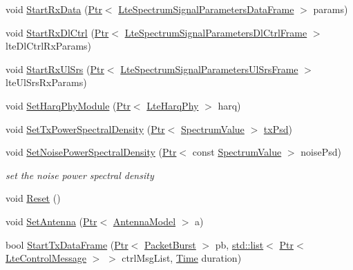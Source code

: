 \begin{DoxyCompactItemize}
\item 
void \hyperlink{classns3_1_1LteSpectrumPhy_a496c5216723459c21c02576f8a5056af}{Start\+Rx\+Data} (\hyperlink{classns3_1_1Ptr}{Ptr}$<$ \hyperlink{structns3_1_1LteSpectrumSignalParametersDataFrame}{Lte\+Spectrum\+Signal\+Parameters\+Data\+Frame} $>$ params)
\item 
void \hyperlink{classns3_1_1LteSpectrumPhy_a2ea6de28b21dcae1c26d42aecac47341}{Start\+Rx\+Dl\+Ctrl} (\hyperlink{classns3_1_1Ptr}{Ptr}$<$ \hyperlink{structns3_1_1LteSpectrumSignalParametersDlCtrlFrame}{Lte\+Spectrum\+Signal\+Parameters\+Dl\+Ctrl\+Frame} $>$ lte\+Dl\+Ctrl\+Rx\+Params)
\item 
void \hyperlink{classns3_1_1LteSpectrumPhy_a3023664623c55b331bee210d6b3cc5a5}{Start\+Rx\+Ul\+Srs} (\hyperlink{classns3_1_1Ptr}{Ptr}$<$ \hyperlink{structns3_1_1LteSpectrumSignalParametersUlSrsFrame}{Lte\+Spectrum\+Signal\+Parameters\+Ul\+Srs\+Frame} $>$ lte\+Ul\+Srs\+Rx\+Params)
\item 
void \hyperlink{classns3_1_1LteSpectrumPhy_a2d7460008f3cf83f49e1d47d4b4b4747}{Set\+Harq\+Phy\+Module} (\hyperlink{classns3_1_1Ptr}{Ptr}$<$ \hyperlink{classns3_1_1LteHarqPhy}{Lte\+Harq\+Phy} $>$ harq)
\item 
void \hyperlink{classns3_1_1LteSpectrumPhy_a8c92f3b90b60b6b726bbb9b224eb4db7}{Set\+Tx\+Power\+Spectral\+Density} (\hyperlink{classns3_1_1Ptr}{Ptr}$<$ \hyperlink{classns3_1_1SpectrumValue}{Spectrum\+Value} $>$ \hyperlink{lte__link__budget__x2__handover__measures_8m_a684fe3101a5e48a5fcc57cab8dbcd1aa}{tx\+Psd})
\item 
void \hyperlink{classns3_1_1LteSpectrumPhy_a80f6b7104e4b08fb4b744ec727e1f42e}{Set\+Noise\+Power\+Spectral\+Density} (\hyperlink{classns3_1_1Ptr}{Ptr}$<$ const \hyperlink{classns3_1_1SpectrumValue}{Spectrum\+Value} $>$ noise\+Psd)
\begin{DoxyCompactList}\small\item\em set the noise power spectral density \end{DoxyCompactList}\item 
void \hyperlink{classns3_1_1LteSpectrumPhy_afa0806266a308e644b88f383c5586cc4}{Reset} ()
\item 
void \hyperlink{classns3_1_1LteSpectrumPhy_a4443ea58aafc0b3eb7fa5d5f49d2dd9d}{Set\+Antenna} (\hyperlink{classns3_1_1Ptr}{Ptr}$<$ \hyperlink{classns3_1_1AntennaModel}{Antenna\+Model} $>$ a)
\item 
bool \hyperlink{classns3_1_1LteSpectrumPhy_a46c1be2d6a6eac5e333cf83d261744af}{Start\+Tx\+Data\+Frame} (\hyperlink{classns3_1_1Ptr}{Ptr}$<$ \hyperlink{classns3_1_1PacketBurst}{Packet\+Burst} $>$ pb, \hyperlink{openflow-interface_8h_afd9bcfa176617760671b67580f536fa7}{std\+::list}$<$ \hyperlink{classns3_1_1Ptr}{Ptr}$<$ \hyperlink{classns3_1_1LteControlMessage}{Lte\+Control\+Message} $>$ $>$ ctrl\+Msg\+List, \hyperlink{classns3_1_1Time}{Time} duration)

\end{DoxyCompactItemize}
